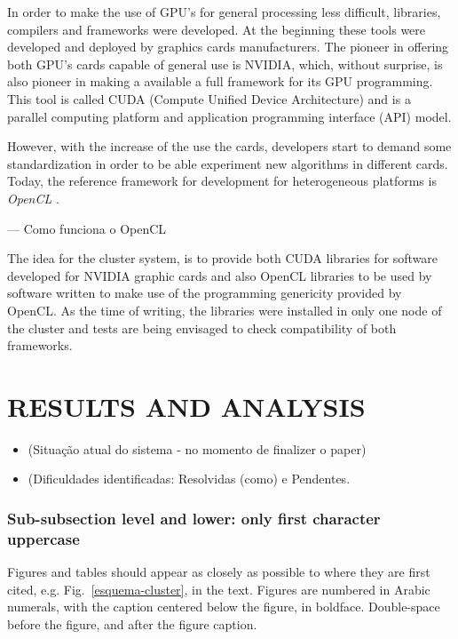 \documentclass[twoside,a4paper,12pt,english]{inac17}
\begin{document}
In order to make the use of GPU's for general processing less difficult, libraries, compilers and
frameworks were developed. At the beginning these tools were developed and deployed by graphics cards
manufacturers. The pioneer in offering both GPU's cards capable of general use is NVIDIA, which,
without surprise, is also pioneer in making a available a full framework for its GPU programming.
This tool is called CUDA (Compute Unified Device Architecture) and is a parallel computing platform
and application programming interface (API) model.

However, with the increase of the use the cards, developers start to demand some
standardization in order to be able experiment new algorithms in different cards. Today, the
reference framework for development for heterogeneous platforms is \textit{OpenCL} \cite{OpenCL}.

--- Como funciona o OpenCL

The idea for the cluster system, is to provide both CUDA libraries for
software developed for NVIDIA graphic cards and also OpenCL libraries to
be used by software written to make use of the programming genericity
provided by OpenCL. As the time of writing, the libraries were installed
in only one node of the cluster and tests are being envisaged to check
compatibility of both frameworks.

\section{RESULTS AND ANALYSIS}

\begin{itemize}

\item (Situação atual do sistema - no momento de finalizer o paper)
\item (Dificuldades identificadas: Resolvidas (como) e Pendentes.
  
\end{itemize}

\subsubsection{Sub-subsection level and lower: only first character uppercase}

Figures and tables should appear as closely as possible to where they are first cited, e.g. Fig.~\ref{esquema-cluster}, in the text.  Figures are numbered in Arabic numerals, with the caption centered below the figure, in boldface. Double-space before the figure, and after the figure caption.
\end{document}
